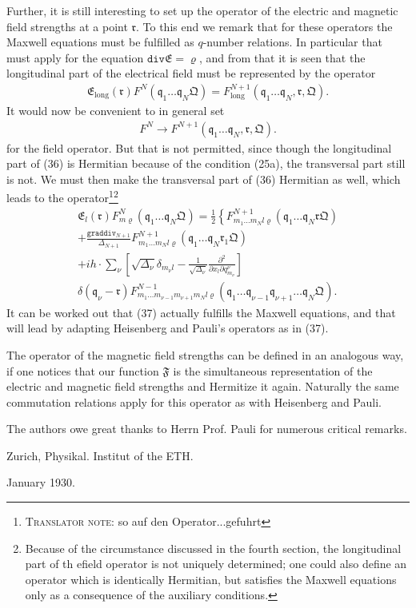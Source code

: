 \documentclass[a4paper,11pt]{article}
\newcommand{\?}[2]{#1\footnote{\textsc{Translator note}: #2}}
\newcommand{\nequ}[2]{\begin{align*}\tag{#1}#2\end{align*}}
\newcommand{\uequ}[1]{\begin{align*}#1\end{align*}}
\renewcommand{\operatorfont}[1]{\texttt{#1}}
\newcommand{\grad}{\operatorfont{grad}}
\renewcommand{\div}{\operatorfont{div}}
\newcommand{\mf}[1]{\mathfrak{#1}}
\begin{document}
Further, it is still interesting to set up the operator of the electric and magnetic field strengths at a point $\mf{r}$. To this end we remark that for these operators the Maxwell equations must be fulfilled as $q$-number relations. In particular that must apply for the equation $\div\mf{E} = \varrho$, and from that it is seen that the longitudinal part of the electrical field must be represented by the operator
\uequ{
\mf{E}_\text{long}(\mf{r})F^N(\mf{q}_1 \dots \mf{q}_N \mf{Q})
 = F^{N+1}_\text{long}(\mf{q}_1 \dots \mf{q}_N, \mf{r}, \mf{Q}).
}
It would now be convenient to in general set
\nequ{36}{
F^N \to F^{N+1}(\mf{q}_1 \dots \mf{q}_N, \mf{r}, \mf{Q}).
}
for the field operator. But that is not permitted, since though the longitudinal part of (36) is Hermitian because of the condition (25a), the transversal part still is not. We must then make the transversal part of (36) Hermitian as well, \?{which leads to the operator}{so auf den Operator...gefuhrt}\footnote{Because of the circumstance discussed in the fourth section, the longitudinal part of th efield operator is not uniquely determined; one could also define an operator which is identically Hermitian, but satisfies the Maxwell equations only as a consequence of the auxiliary conditions.}
\nequ{37}{
\mf{E}_l(\mf{r})F^N_{m\varrho}(\mf{q}_1 \dots \mf{q}_N \mf{Q})
 = \frac{1}{2}\left\{F_{m_1 \dots m_N l \varrho}^{N+1}
 \left(\mf{q}_1 \dots \mf{q}_N \mf{rQ} \right) \right.\\
+ \frac{\grad\div_{N+1}}{\Delta_{N+1}}
F_{m_1 \dots m_N l \varrho}^{N+1}\left(\mf{q}_1 \dots \mf{q}_N \mf{r}_1\mf{Q} \right)\\
+ ih\cdot\sum\limits_\nu\left[\sqrt{\Delta_\nu}
\delta_{m_\nu l}- \frac{1}{\sqrt{\Delta_\nu}}
\frac{\partial^2}{\partial x_l \partial q_{m_\nu}^\nu }\right]\\
\delta(\mf{q}_\nu - \mf{r})
F_{m_1 \dots m_{\nu - 1} m_{\nu + 1} m_N l \varrho}^{N-1}
\left(\mf{q}_1 \dots \mf{q}_{\nu - 1} \mf{q}_{\nu + 1} \dots \mf{q}_N \mf{Q} \right).
}
It can be worked out that (37) actually fulfills the Maxwell equations, and that will lead by adapting Heisenberg and Pauli's operators as in (37).

The operator of the magnetic field strengths can be defined in an analogous way, if one notices that our function $\mf{F}$ is the simultaneous representation of the electric and magnetic field strengths and Hermitize it again. Naturally the same commutation relations apply for this operator as with Heisenberg and Pauli.

The authors owe great thanks to Herrn Prof. Pauli for numerous critical remarks.

Zurich, Physikal. Institut of the ETH.

January 1930.
\end{document}
